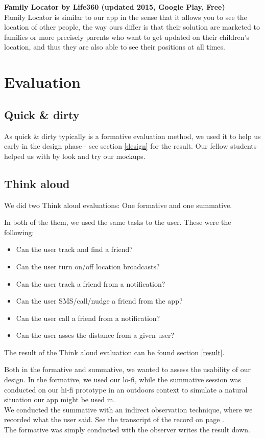 \documentclass[runningheads,a4paper]{llncs}
\begin{document}
\textbf{Family Locator by Life360 (updated 2015, Google Play, Free)}\\
Family Locator is similar to our app in the sense that it allows you to see the location of other people, the way ours differ is that their solution are marketed to families or more precisely parents who want to get updated on their children's location, and thus they are also able to see their positions at all times. 


\section{Evaluation}
\subsection*{Quick \& dirty}
As quick \& dirty typically is a formative evaluation method, we used it to help us early in the design phase - see section \ref{design} for the result.  Our fellow students helped us with by look and try our mockups. 

\subsection*{Think aloud}
We did two Think aloud evaluations: One formative and one summative.

In both of the them, we used the same tasks to the user. These were the following: 

\begin{itemize}
\item Can the user track and find a friend? 
\item Can the user turn on/off location broadcasts? 
\item Can the user track a friend from a notification?
\item Can the user SMS/call/nudge a friend from the app?
\item Can the user call a friend from a notification?
\item Can the user asses the distance from a given user?
\end{itemize}
The result of the Think aloud evaluation can be found section \ref{result}. 

Both in the formative and summative, we wanted to assess the usability of our design. In the formative, we used our lo-fi, while the summative session was conducted on our hi-fi prototype in an outdoors context to simulate a natural situation our app might be used in.\\
We conducted the summative with an indirect observation technique, where we recorded what the user said. See the transcript of the record on page \pageref{transcript}. \\
The formative was simply conducted with the observer writes the result down. 
\end{document}
